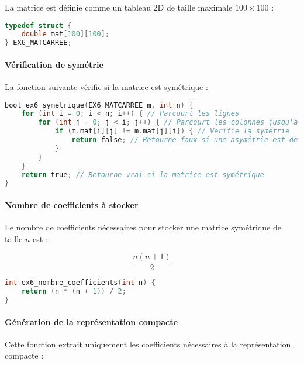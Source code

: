 \documentclass[a4paper,12pt]{article}
\begin{document}
La matrice est définie comme un tableau 2D de taille maximale $100 \times 100$ :

\begin{lstlisting}[language=C, caption={Structure d’une matrice carrée}]
typedef struct {
    double mat[100][100];
} EX6_MATCARREE;
\end{lstlisting}

\paragraph{Vérification de symétrie}

La fonction suivante vérifie si la matrice est symétrique :

\begin{lstlisting}[language=C, caption={Verification de la symetrie}]
bool ex6_symetrique(EX6_MATCARREE m, int n) {
    for (int i = 0; i < n; i++) { // Parcourt les lignes
        for (int j = 0; j < i; j++) { // Parcourt les colonnes jusqu'à la diagonale
            if (m.mat[i][j] != m.mat[j][i]) { // Verifie la symetrie
                return false; // Retourne faux si une asymétrie est detectee
            }
        }
    }
    return true; // Retourne vrai si la matrice est symétrique
}
\end{lstlisting}

\paragraph{Nombre de coefficients à stocker}

Le nombre de coefficients nécessaires pour stocker une matrice symétrique de taille $n$ est :

\[
\frac{n(n+1)}{2}
\]

\begin{lstlisting}[language=C, caption={Calcul du nombre de coefficients}]
int ex6_nombre_coefficients(int n) {
    return (n * (n + 1)) / 2;
}
\end{lstlisting}

\paragraph{Génération de la représentation compacte}

Cette fonction extrait uniquement les coefficients nécessaires à la représentation compacte :
\end{document}

